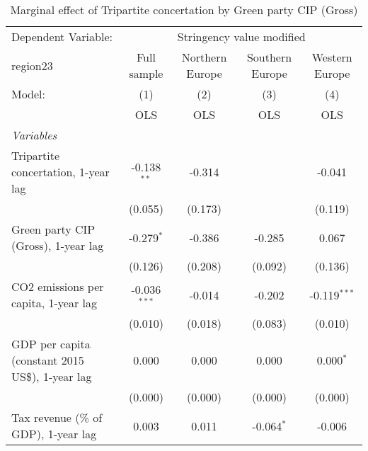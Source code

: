 
\begin{table}[htbp]
   \caption{Marginal effect of Tripartite concertation by Green party CIP (Gross)}
   \centering
   \begin{tabular}{lcccc}
      \toprule
      Dependent Variable: & \multicolumn{4}{c}{Stringency value modified}\\
      region23                                                                  & Full sample    & Northern Europe & Southern Europe & Western Europe \\   
      Model:                                                                    & (1)            & (2)             & (3)             & (4)\\  
                                                                                &  OLS           & OLS             & OLS             & OLS\\  
      \midrule
      \emph{Variables}\\
      Tripartite concertation, 1-year lag                                       & -0.138$^{**}$  & -0.314          &                 & -0.041\\   
                                                                                & (0.055)        & (0.173)         &                 & (0.119)\\   
      Green party CIP (Gross), 1-year lag                                       & -0.279$^{*}$   & -0.386          & -0.285          & 0.067\\   
                                                                                & (0.126)        & (0.208)         & (0.092)         & (0.136)\\   
      CO2 emissions per capita, 1-year lag                                      & -0.036$^{***}$ & -0.014          & -0.202          & -0.119$^{***}$\\   
                                                                                & (0.010)        & (0.018)         & (0.083)         & (0.010)\\   
      GDP per capita (constant 2015 US\$), 1-year lag                           & 0.000          & 0.000           & 0.000           & 0.000$^{*}$\\   
                                                                                & (0.000)        & (0.000)         & (0.000)         & (0.000)\\   
      Tax revenue (\% of GDP), 1-year lag                                       & 0.003          & 0.011           & -0.064$^{*}$    & -0.006\\   

\end{tabular}
\end{table}

